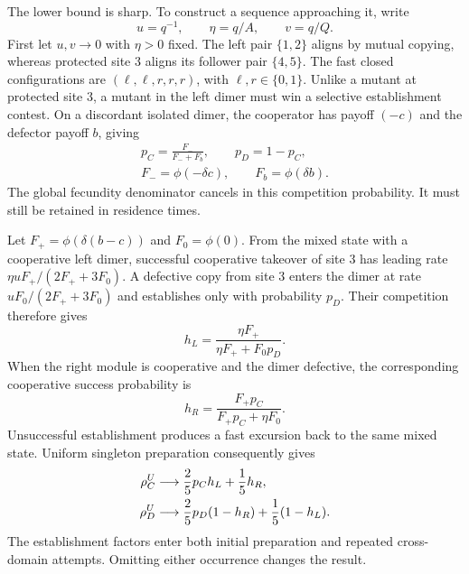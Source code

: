 \documentclass[aps,pre,reprint,amsmath,amssymb,longbibliography]{revtex4-2}
\begin{document}
The lower bound is sharp. To construct a sequence approaching it, write
\begin{equation}
 u=q^{-1},\qquad \eta=q/A,\qquad v=q/Q.
 \label{app:path-p5-small-coordinates}
\end{equation}
First let $u,v\to0$ with $\eta>0$ fixed. The left pair $\{1,2\}$ aligns
by mutual copying, whereas protected site 3 aligns its follower pair
$\{4,5\}$. The fast closed configurations are
$(\ell,\ell,r,r,r)$, with $\ell,r\in\{0,1\}$.
Unlike a mutant at protected site 3, a mutant in the left dimer must
win a selective establishment contest. On a discordant isolated dimer,
the cooperator has payoff $(-c)$ and the defector payoff $b$, giving
\begin{equation}
 \begin{gathered}
 p_C=\frac{F_-}{F_-+F_b},\qquad p_D=1-p_C,\\
 F_-=\phi(-\delta c),\qquad F_b=\phi(\delta b).
 \end{gathered}
 \label{app:path-p5-establishment}
\end{equation}
The global fecundity denominator cancels in this competition probability.
It must still be retained in residence times.

Let $F_+=\phi(\delta(b-c))$ and $F_0=\phi(0)$. From the mixed state with
a cooperative left dimer, successful cooperative takeover of site 3
has leading rate $\eta uF_+/(2F_++3F_0)$. A defective copy from site 3
enters the dimer at rate $uF_0/(2F_++3F_0)$ and establishes only with
probability $p_D$. Their competition therefore gives
\begin{equation}
 h_L=\frac{\eta F_+}{\eta F_++F_0p_D}.
 \label{app:path-p5-left-committor}
\end{equation}
When the right module is cooperative and the dimer defective, the
corresponding cooperative success probability is
\begin{equation}
 h_R=\frac{F_+p_C}{F_+p_C+\eta F_0}.
 \label{app:path-p5-right-committor}
\end{equation}
Unsuccessful establishment produces a fast excursion back to the same
mixed state. Uniform singleton preparation consequently gives
\begin{align}
 \rho_C^U&\longrightarrow\frac25p_Ch_L+\frac15h_R,\notag\\
 \rho_D^U&\longrightarrow\frac25p_D(1-h_R)+\frac15(1-h_L).
 \label{app:path-p5-terminal-law}
\end{align}
The establishment factors enter both initial preparation and repeated
cross-domain attempts. Omitting either occurrence changes the result.
\end{document}
